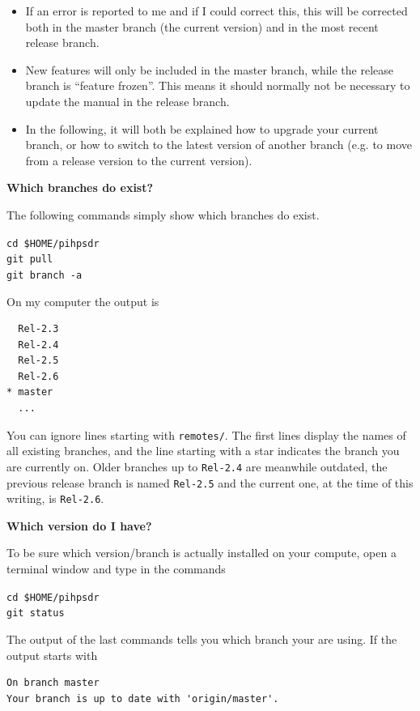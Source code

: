 \documentclass[12pt]{book}
\def\grtt#1{\texttt{\color{magenta}#1}}
\begin{document}
\begin{itemize}
\item{If an error is reported to me and if I could correct this,
this will be corrected both in the master branch (the current version) and in the
most recent release branch.}
\item{New features will only be included in the master branch, while the release branch is ``feature frozen''.
This means it should normally not be necessary to update the manual in the release branch.}
\item{In the following, it will both be explained how to upgrade your current branch, or how to
switch to the latest version of  another branch (e.g. to move from a release version to the current version).}
\end{itemize}

\textbf{Which branches do exist?}

The following commands simply show which branches do exist.

\grtt{cd \$HOME/pihpsdr} \\
\grtt{git pull} \\
\grtt{git branch -a}

On my computer the output is

\begin{verbatim}
  Rel-2.3
  Rel-2.4
  Rel-2.5
  Rel-2.6
* master
  ...
\end{verbatim}

You can ignore lines starting with \texttt{remotes/}. The first lines display the names of all
existing branches, and the line starting with a star indicates the branch you are currently on.
Older branches up to \texttt{Rel-2.4} are meanwhile outdated, the previous
release branch is named \texttt{Rel-2.5} and the current one, at the time of this writing, is \texttt{Rel-2.6}.

\medskip
\textbf{Which version do I have?}

To be sure which version/branch is actually installed on your compute, open a terminal  window and
type in the commands

\grtt{cd \$HOME/pihpsdr} \\
\grtt{git status}

The output of the last commands tells you which branch your are using. If the output starts
with

\begin{verbatim}
On branch master
Your branch is up to date with 'origin/master'.
\end{verbatim}
\end{document}
